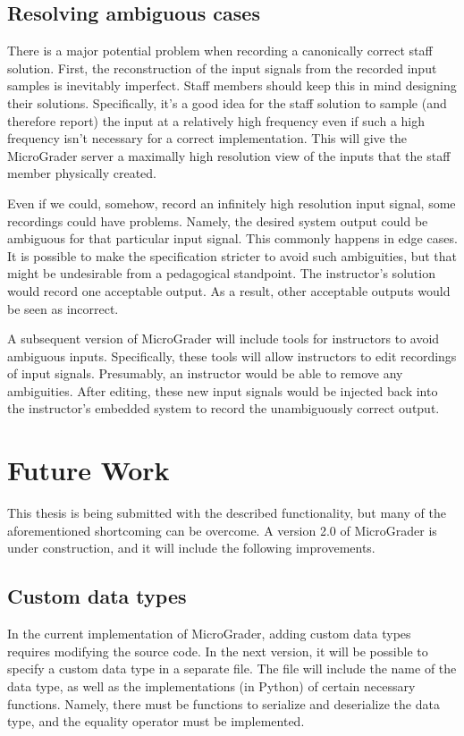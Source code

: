 \documentclass[12pt]{article}
\begin{document}
\subsection{Resolving ambiguous cases}
\label{sec:resolve-ambiguity}
There is a major potential problem when recording a canonically correct staff solution.  First, the reconstruction of the input signals from the recorded input samples is inevitably imperfect.  Staff members should keep this in mind designing their solutions.  Specifically, it's a good idea for the staff solution to sample (and therefore report) the input at a relatively high frequency even if such a high frequency isn't necessary for a correct implementation.  This will give the MicroGrader server a maximally high resolution view of the inputs that the staff member physically created.

Even if we could, somehow, record an infinitely high resolution input signal, some recordings could have problems.  Namely, the desired system output could be ambiguous for that particular input signal.  This commonly happens in edge cases.  It is possible to make the specification stricter to avoid such ambiguities, but that might be undesirable from a pedagogical standpoint.  The instructor's solution would record one acceptable output.  As a result, other acceptable outputs would be seen as incorrect.

A subsequent version of MicroGrader will include tools for instructors to avoid ambiguous inputs.  Specifically, these tools will allow instructors to edit recordings of input signals.  Presumably, an instructor would be able to remove any ambiguities.  After editing, these new input signals would be injected back into the instructor's embedded system to record the unambiguously correct output.


\newpage
\section{Future Work}
This thesis is being submitted with the described functionality, but many of the aforementioned shortcoming can be overcome.  A version 2.0 of MicroGrader is under construction, and it will include the following improvements.

\subsection{Custom data types}
In the current implementation of MicroGrader, adding custom data types requires modifying the source code.  In the next version, it will be possible to specify a custom data type in a separate file.  The file will include the name of the data type, as well as the implementations (in Python) of certain necessary functions.  Namely, there must be functions to serialize and deserialize the data type, and the equality operator must be implemented.
\end{document}
